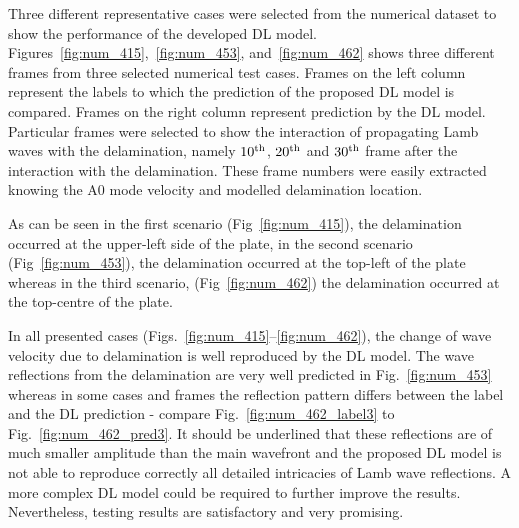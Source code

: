 \documentclass[sn-mathphys-num]{sn-jnl}%
\begin{document}
	Three different representative cases were selected from the numerical 
	dataset to show the performance of the developed DL model.
	Figures~\ref{fig:num_415},~\ref{fig:num_453}, 
	and~\ref{fig:num_462} shows three different frames from three selected 
	numerical test cases.  
	Frames on the left column represent the labels to which the prediction of 
	the proposed DL model is compared.
	Frames on the right column represent prediction by the DL model.
	Particular frames were selected to show the interaction of propagating Lamb 
	waves with the delamination, namely $10\textsuperscript{th}$, 
	$20\textsuperscript{th}$ and $30\textsuperscript{th}$ frame after the 
	interaction with the delamination. These frame numbers were easily 
	extracted knowing the A0 mode velocity and modelled delamination location. 
	
	As can be seen in the first scenario (Fig~\ref{fig:num_415}), the 
	delamination occurred at the upper-left side of the plate, in the second 
	scenario (Fig~\ref{fig:num_453}), the delamination occurred at the top-left 
	of the plate whereas in the third scenario, (Fig~\ref{fig:num_462}) the 
	delamination occurred at the top-centre of the plate. 
	
	In all presented cases (Figs.~\ref{fig:num_415}--\ref{fig:num_462}), the 
	change of wave velocity due to delamination is well reproduced by the DL 
	model.
	The wave reflections from the delamination are very well predicted in 
	Fig.~\ref{fig:num_453} whereas in some cases and frames the reflection 
	pattern differs between the label and the DL prediction - compare 
	Fig.~\ref{fig:num_462_label3} to Fig.~\ref{fig:num_462_pred3}.
	It should be underlined that these reflections are of much smaller 
	amplitude than the main wavefront and the proposed DL model is not able to 
	reproduce correctly all detailed intricacies of Lamb wave reflections. 
	A more complex DL model could be required to further improve the results.
	Nevertheless, testing results are satisfactory and very promising.
	
\end{document}
